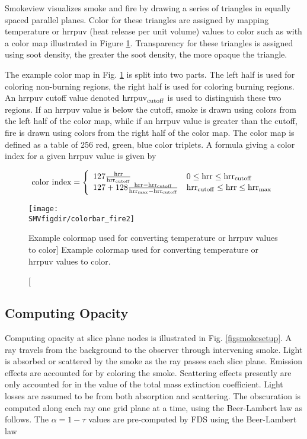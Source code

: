 {Smokeview visualizes smoke and fire by drawing a series of triangles in equally spaced parallel planes.
Color for these triangles are assigned by mapping temperature or hrrpuv (heat release per unit volume) values
to color such as with a color map illustrated in Figure \ref{fig:colormaps}.
Transparency for these triangles is assigned using soot density, the greater the soot density, the more opaque the triangle.

The example color map in Fig.
\ref{fig:colormaps} is split into two parts.  The left half is used
for coloring non-burning regions, the right half is used for coloring burning regions.
An hrrpuv cutoff value denoted ${\rm hrrpuv}_{\rm cutoff}$ is used to
distinguish these two regions.
If an hrrpuv value is below the cutoff,
smoke is drawn using colors from the left half of the color map, while if an hrrpuv value is greater than the cutoff,
fire is drawn using colors from the right half of the color map.  The color map is defined as a table
of 256 red, green, blue color triplets.  A formula giving a color index for a given hrrpuv value is given by

\newcommand{\hrr}{{\rm hrr}}
\newcommand{\hrrcutoff}{{\rm hrr}_{\rm cutoff}}
\newcommand{\hrrmax}{{\rm hrr}_{\rm max}}

\begin{eqnarray}
\mbox{color index}=\left\{
\begin{array}{ll}
  127\frac{\hrr}{\hrrcutoff} & 0 \le \hrr \le \hrrcutoff \\
  127 + 128\frac{\hrr-\hrrcutoff}{\hrrmax-\hrrcutoff} & \hrrcutoff \le \hrr \le \hrrmax
\end{array}
\right.
\end{eqnarray}

\begin{figure}[bph]
\begin{center}
\texttt{[image: \\SMVfigdir/colorbar\_fire2]}
\end{center}
\caption
[Example colormap used for converting temperature or hrrpuv values to color]
{Example colormap used for converting temperature or hrrpuv values to color.}
\label{fig:colormaps}
\end{figure}


\subsection{Computing Opacity}
Computing opacity at slice plane nodes is illustrated in Fig.
\ref{figsmokesetup}. A ray travels from the background to the
observer through intervening smoke. Light is absorbed or scattered
by the smoke as the ray passes each slice plane. Emission effects
are accounted for by coloring the smoke.  Scattering effects
presently are only accounted for in the value of the total mass
extinction coefficient.  Light losses are assumed to be from both
absorption and scattering. The obscuration is computed along each
ray one grid plane at a time, using the Beer-Lambert law as
follows.  The $\alpha=1-\tau$ values are pre-computed by FDS using
the Beer-Lambert law~\cite{Siegel:2001}

}
